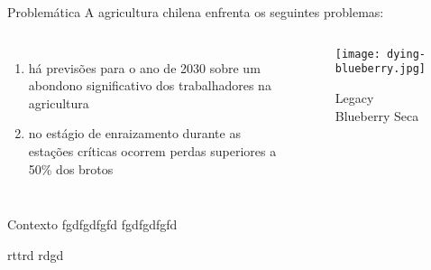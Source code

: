 \begin{frame}[t]{Problemática} 
    \transdissolve[duration=0.5]
    A agricultura chilena enfrenta os seguintes problemas:
        \begin{columns}[t]
                \begin{enumerate}
                    \item há previsões para o ano de 2030 sobre um abondono significativo dos trabalhadores na agricultura
                    \item no estágio de enraizamento durante as estações críticas ocorrem perdas superiores a 50\% dos brotos
                \end{enumerate}
            \vspace{-0.5cm}
            \begin{center}
                \begin{figure}
                    \caption{Legacy Blueberry Seca}
                    \texttt{[image: dying-blueberry.jpg]}
                \end{figure}
            \end{center}
        \end{columns}
\end{frame}

\begin{frame}[t]{Contexto} 
    \newcommand\vspacecontexto{0.2cm}
    \transdissolve[duration=0.5]
    fgdfgdfgfd fgdfgdfgfd \vspace{\vspacecontexto}
    
    rttrd rdgd\vspace{\vspacecontexto} 
\end{frame}
